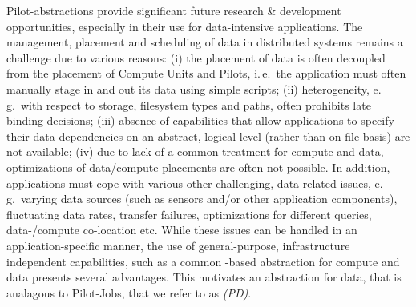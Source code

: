 \documentclass{sig-alternate}
\begin{document}
Pilot-abstractions provide significant future research \& development
opportunities, especially in their use for data-intensive
applications.
The management, placement and scheduling of data in distributed
systems remains a challenge due to various reasons: (i) the placement
of data is often decoupled from the placement of Compute Units and
Pilots, i.\,e.\ the application must often manually stage in and out
its data using simple scripts; (ii) heterogeneity, e.\,g.\ with
respect to storage, filesystem types and paths, often prohibits late
binding decisions; (iii) absence of capabilities that allow
applications to specify their data dependencies on an abstract,
logical level (rather than on file basis) are not available; (iv) due
to lack of a common treatment for compute and data, optimizations of
data/compute placements are often not possible. In addition,
applications must cope with various other challenging, data-related
issues, e.\,g.\ varying data sources (such as sensors and/or other
application components), fluctuating data rates, transfer failures,
optimizations for different queries, data-/compute co-location
etc. While these issues can be handled in an application-specific
manner, the use of general-purpose, infrastructure independent
capabilities, such as a common \pilot-based abstraction for compute
and data presents several advantages. This motivates an abstraction
for data, that is analagous to Pilot-Jobs, that we refer to as
\emph{\pilotdata (PD)}.






 
\end{document}
